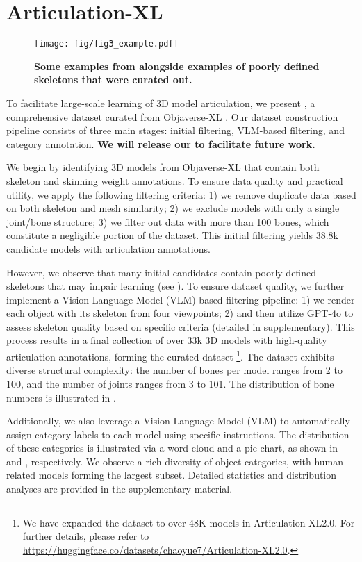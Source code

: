 \section{Articulation-XL}
\label{arti-xl}

\begin{figure}
    \centering
    \texttt{[image: fig/fig3\_example.pdf]}
    \caption{\textbf{Some examples from \ourdata{} alongside examples of poorly defined skeletons that were curated out.}}
    \label{fig:examples}
    \vspace{-16pt}
  \end{figure}




To facilitate large-scale learning of 3D model articulation, we present \ourdata{}, a comprehensive dataset curated from Objaverse-XL \cite{deitke2023objaverse, deitke2024objaverse}. Our dataset construction pipeline consists of three main stages: initial filtering, VLM-based filtering, and category annotation. 
\textbf{We will release our \ourdata{} to facilitate future work.}

 We begin by identifying 3D models from Objaverse-XL that contain both skeleton and skinning weight annotations. To ensure data quality and practical utility, we apply the following filtering criteria: 1) we remove duplicate data based on both skeleton and mesh similarity; 2) we exclude models with only a single joint/bone structure; 3) we filter out data with more than 100 bones, which constitute a negligible portion of the dataset. This initial filtering yields 38.8k candidate models with articulation annotations.

 However, we observe that many initial candidates contain poorly defined skeletons that may impair learning (see ). To ensure dataset quality, we further implement a Vision-Language Model (VLM)-based filtering pipeline: 1) we render each object with its skeleton from four viewpoints; 2) and then utilize GPT-4o \cite{openai_gpt4o} to assess skeleton quality based on specific criteria (detailed in supplementary).
This process results in a final collection of over 33k 3D models with high-quality articulation annotations, forming the curated dataset \ourdata{} \footnote{We have expanded the dataset to over 48K models in Articulation-XL2.0. For further details, please refer to \url{https://huggingface.co/datasets/chaoyue7/Articulation-XL2.0}.}. The dataset exhibits diverse structural complexity: the number of bones per model ranges from 2 to 100, and the number of joints ranges from 3 to 101. The distribution of bone numbers is illustrated in . 

 Additionally, we also leverage a Vision-Language Model (VLM) to automatically assign category labels to each model using specific instructions.
The distribution of these categories is illustrated via a word cloud and a pie chart, as shown in  and , respectively. We observe a rich diversity of object categories, with human-related models forming the largest subset. Detailed statistics and distribution analyses are provided in the supplementary material.

